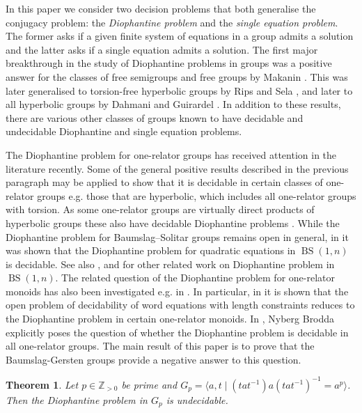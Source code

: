 \documentclass[11pt]{amsart}
\newtheorem{theorem}{Theorem}[section]
\theoremstyle{definition}
\numberwithin{theorem}{section}
\DeclareMathOperator{\BS}{BS}
\newcommand{\Z}{\mathbb{Z}}
\begin{document}
	In this paper we consider two decision problems that both generalise the conjugacy
	problem: the \emph{Diophantine problem} and the \emph{single equation
	problem}. The former asks if a given finite system of equations in a group
	admits a solution and the latter asks if a single equation admits a
	solution. The first major breakthrough in the study of Diophantine problems
	in groups was a positive answer for the classes of free semigroups and free
	groups by Makanin \cite{Makanin_systems, Makanin_semigroups,
	Makanin_eqns_free_group}. This was later generalised to torsion-free
	hyperbolic groups by Rips and Sela \cite{RipsSela}, and later to all
	hyperbolic groups by Dahmani and Guirardel \cite{dahmani_guirardel}.  
In addition to these results, there are various
	other classes of groups known to have decidable \cite{Dahmani09,
	DiekertMuscholl, duchin_liang_shapiro, Ersov72, GarettaMetabelian, GarettaRandomNilpotent, Levine2022} and undecidable \cite{Dong25,
			duchin_liang_shapiro, ElliottLevine, 
			Garreta2020, GrayLevine25, almost-1rel-DP,
			KharlampovichMiasnikov2025, romankov_undecidable_first,
	RomankovMetabelian} Diophantine and single equation problems. 

The Diophantine problem for one-relator groups has received attention in the
literature recently.  Some of the general positive results described in the
previous paragraph may be applied to show that it is decidable in certain
classes of one-relator groups e.g.  those that are hyperbolic, which includes
all one-relator groups with torsion.  As some one-relator groups are virtually
direct products of hyperbolic groups these also have decidable Diophantine
problems \cite{CiobanuGrayLevineInPrep, CiobanuHoltRees,
CFOneRelatorDiophantine}.  While the Diophantine problem for Baumslag--Solitar
groups remains open in general, in \cite{kharlampovich2020diophantine} it was
shown that the Diophantine problem for quadratic equations in $\BS(1, n)$ is
decidable. 
See also  
\cite{Duncan2023}, \cite{Mandel2023} and \cite{Mandel2023b} for other related work on 
Diophantine problem in $\BS(1,n)$.
The related question of the Diophantine problem for one-relator monoids has also been investigated e.g. in  
\cite{Kharlampovich2019, Garreta2021}. In particular, in 
\cite{Garreta2021} 
it is shown that the open problem of decidability of word equations with length constraints reduces to the Diophantine problem in certain one-relator monoids.
In \cite{CFOneRelatorDiophantine}, Nyberg Brodda explicitly poses the question of whether the Diophantine
	problem is decidable in all one-relator groups. 
The main result of this paper is to  
prove that the Baumslag-Gersten groups
provide a negative answer to this question.
\begin{theorem}
	\label{main-thm}
	Let \(p \in \Z_{> 0}\) be prime and \(G_p = \langle a, t \mid
	(tat^{-1}) a(tat^{-1})^{-1} = a^p \rangle\). Then the Diophantine problem
	in \(G_p\) is undecidable. 
\end{theorem}
\end{document}
